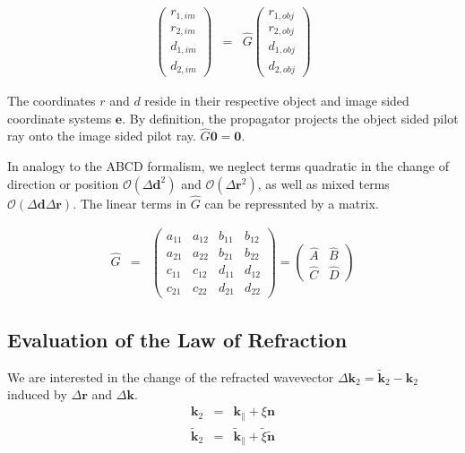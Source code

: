 \documentclass[12pt,a4paper,twoside,openright,BCOR10mm,headsepline,titlepage,abstracton,chapterprefix,final]{scrreprt}
\newcommand\Vector[1]{{\mathbf{#1}}}
\newcommand\wavenumber{k}
\newcommand\Wavevector{\Vector{\wavenumber}}
\begin{document}
\begin{eqnarray}
 \begin{pmatrix}
  r_{1,im} \\ r_{2,im} \\ d_{1,im} \\ d_{2,im}
 \end{pmatrix}
 &=&
 \hat{G}
 \begin{pmatrix}
  r_{1,obj} \\ r_{2,obj} \\ d_{1,obj} \\ d_{2,obj}
 \end{pmatrix}
 \end{eqnarray}

The coordinates $r$ and $d$ reside in their respective object and image sided coordinate systems $\Vector{e}$.
By definition, the propagator projects the object sided pilot ray onto the image sided pilot ray.
$\hat{G}\Vector{0} = \Vector{0}$.

In analogy to the ABCD formalism, we neglect terms quadratic in the change of direction or position 
$\mathcal{O}(\Delta\Vector{d}^2)$ and $\mathcal{O}(\Delta\Vector{r}^2)$, as well as mixed terms $\mathcal{O}(\Delta\Vector{d}\Delta\Vector{r})$.
The linear terms in $\hat{G}$ can be repressnted by a matrix.

\begin{eqnarray}
 \hat{G} &=&
 \begin{pmatrix}
  a_{11} & a_{12} & b_{11} & b_{12} \\
  a_{21} & a_{22} & b_{21} & b_{22} \\  
  c_{11} & c_{12} & d_{11} & d_{12} \\
  c_{21} & c_{22} & d_{21} & d_{22} 
 \end{pmatrix}
 =
 \begin{pmatrix}
  \hat{A} & \hat{B} \\
  \hat{C} & \hat{D}
 \end{pmatrix} 
\end{eqnarray}



\subsection{Evaluation of the Law of Refraction}

We are interested in the change of the refracted wavevector $\Delta\Wavevector_2 = \tilde{\Wavevector}_2 - \Wavevector_2$ induced by $\Delta\Vector{r}$ and $\Delta\Wavevector$.
\begin{eqnarray}
 \Wavevector_2 &=& \Wavevector_{\parallel} + \xi \Vector{n} 
 \\
 \tilde{\Wavevector}_2 &=& \tilde{\Wavevector}_{\parallel} + \tilde{\xi} \tilde{\Vector{n}} 
\end{eqnarray}
\end{document}
